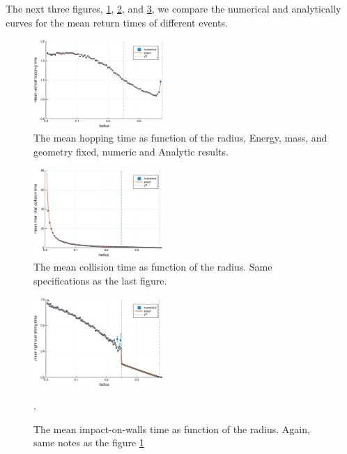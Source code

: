 \documentclass[superscriptaddress,pre,reprint,showpacs,onecolumn]{revtex4-1}
\begin{document}
The next three figures, \ref{MeanHopp01}, \ref{MeanCol01}, and \ref{MeanImp01},  
we compare the
numerical and analytically curves for the mean return times of different events.

\begin{figure}[h]
  \centering
  \includegraphics[width=0.45\textwidth]{./figures/VertHop01.pdf}
  \caption{The mean hopping time as function of the radius, Energy, mass, 
and geometry fixed, numeric and Analytic results.}\label{MeanHopp01}
\end{figure}

\begin{figure}[h]
  \centering
  \includegraphics[width=0.45\textwidth]{./figures/DiscCollisions01.pdf}
  \caption{The mean collision time as function of the radius. Same
    specifications as the last figure. }\label{MeanCol01}
\end{figure}


\begin{figure}[h]
  \centering
  \includegraphics[width=0.45\textwidth]{./figures/HitRightWall01.pdf}
  \caption{The mean impact-on-walls time as function of the radius. Again, same
    notes as the figure \ref{MeanHopp01}}\label{MeanImp01}.
\end{figure}
\end{document}
